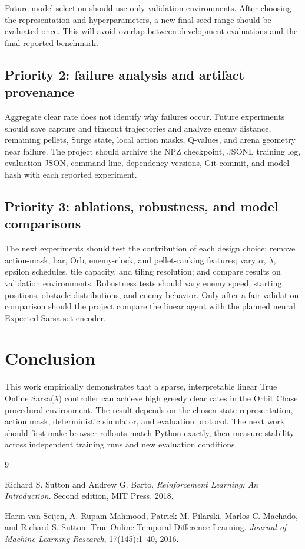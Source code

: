 \documentclass[11pt]{article}
\begin{document}
Future model selection should use only validation environments. After choosing
the representation and hyperparameters, a new final seed range should be
evaluated once. This will avoid overlap between development evaluations and the
final reported benchmark.

\subsection{Priority 2: failure analysis and artifact provenance}

Aggregate clear rate does not identify why failures occur. Future experiments
should save capture and timeout trajectories and analyze enemy distance,
remaining pellets, Surge state, local action masks, Q-values, and arena
geometry near failure. The project should archive the NPZ checkpoint, JSONL
training log, evaluation JSON, command line, dependency versions, Git commit,
and model hash with each reported experiment.

\subsection{Priority 3: ablations, robustness, and model comparisons}

The next experiments should test the contribution of each design choice:
remove action-mask, bar, Orb, enemy-clock, and pellet-ranking features; vary
$\alpha$, $\lambda$, epsilon schedules, tile capacity, and tiling resolution;
and compare results on validation environments. Robustness tests should vary
enemy speed, starting positions, obstacle distributions, and enemy behavior.
Only after a fair validation comparison should the project compare the linear
agent with the planned neural Expected-Sarsa set encoder.

\section{Conclusion}

This work empirically demonstrates that a sparse, interpretable linear True
Online Sarsa($\lambda$) controller can achieve high greedy clear rates in the
Orbit Chase procedural environment. The result depends on the chosen state
representation, action mask, deterministic simulator, and evaluation protocol.
The next work should first make browser rollouts match Python exactly, then
measure stability across independent training runs and new evaluation
conditions.

\begin{thebibliography}{9}

Richard S. Sutton and Andrew G. Barto.
\newblock \emph{Reinforcement Learning: An Introduction}.
\newblock Second edition, MIT Press, 2018.

Harm van Seijen, A. Rupam Mahmood, Patrick M. Pilarski, Marlos C. Machado, and
Richard S. Sutton.
\newblock True Online Temporal-Difference Learning.
\newblock \emph{Journal of Machine Learning Research}, 17(145):1--40, 2016.

\end{thebibliography}
\end{document}
